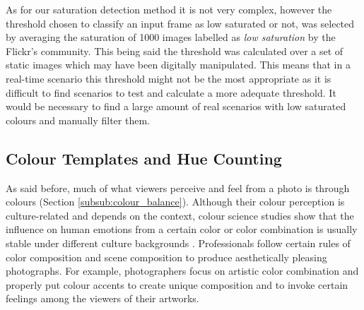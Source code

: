 As for our saturation detection method it is not very complex, however the threshold chosen to classify an input frame as low saturated or not, was selected by averaging the saturation of 1000 images labelled as \emph{low saturation} by the Flickr's community. This being said the threshold was calculated over a set of static images which may have been digitally manipulated. This means that in a real-time scenario this threshold might not be the most appropriate as it is difficult to find scenarios to test and calculate a more adequate threshold. It would be necessary to find a large amount of real scenarios with low saturated colours and manually filter them.

\subsection{Colour Templates and Hue Counting}
\label{sub:colour}

As said before, much of what viewers perceive and feel from a photo is through colours (Section \ref{subsub:colour_balance}). Although their colour perception is culture-related and depends on the context, colour science studies show that the influence on human emotions from a certain color or color combination is usually stable under different culture backgrounds \cite{manav2007color}.
Professionals follow certain rules of color composition and scene composition to produce aesthetically pleasing photographs. For example, photographers focus on artistic color combination and properly put colour accents to create unique composition and to invoke certain feelings among the viewers of their artworks.

